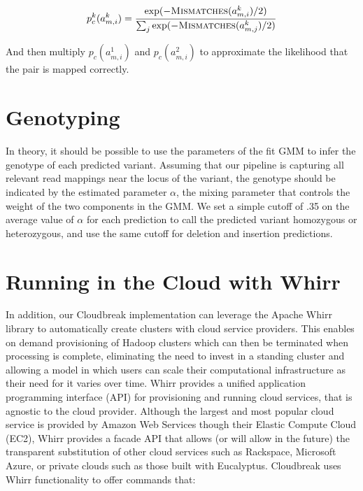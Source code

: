 \[ p^{k}_c(a^{k}_{m,i}) = \frac{\exp({-\textsc{Mismatches}(a^{k}_{m,i})/2)}}{\sum_j{\exp(-\textsc{Mismatches}(a^{k}_{m,j})/2)}} \]

And then multiply $p_c(a^{1}_{m,i})$ and $p_c(a^{2}_{m,i})$ to approximate the likelihood that the pair is mapped correctly.

\section{Genotyping}

In theory, it should be possible to use the parameters of the fit GMM to infer the genotype of each predicted variant. Assuming that our pipeline is capturing all relevant read mappings near the locus of the variant, the genotype should be indicated by the estimated parameter $\alpha$, the mixing parameter that controls the weight of the two components in the GMM. We set a simple cutoff of .35 on the average value of $\alpha$ for each prediction to call the predicted variant homozygous or heterozygous, and use the same cutoff for deletion and insertion predictions.

\section{Running in the Cloud with Whirr}

In addition, our Cloudbreak implementation can leverage the Apache Whirr~\cite{whirr} library to automatically create clusters with cloud service providers. This enables on demand provisioning of Hadoop clusters which can then be terminated when processing is complete, eliminating the need to invest in a standing cluster and allowing a model in which users can scale their computational infrastructure as their need for it varies over time. Whirr provides a unified application programming interface (API) for provisioning and running cloud services, that is agnostic to the cloud provider. Although the largest and most popular cloud service is provided by Amazon Web Services though their Elastic Compute Cloud (EC2), Whirr provides a facade API that allows (or will allow in the future) the transparent substitution of other cloud services such as Rackspace, Microsoft Azure, or private clouds such as those built with Eucalyptus. Cloudbreak uses Whirr functionality to offer commands that:

